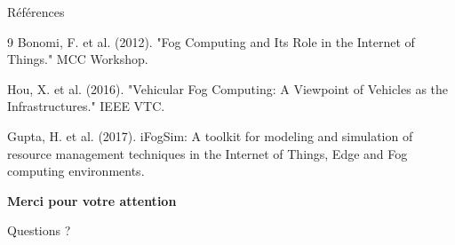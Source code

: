 ﻿\documentclass[aspectratio=169,11pt]{beamer}
\begin{document}
\begin{frame}{R\'ef\'erences}
\footnotesize
\begin{thebibliography}{9}
 Bonomi, F. et al. (2012). "Fog Computing and Its Role in the Internet of Things." MCC Workshop.

 Hou, X. et al. (2016). "Vehicular Fog Computing: A Viewpoint of Vehicles as the Infrastructures." IEEE VTC.

 Gupta, H. et al. (2017). iFogSim: A toolkit for modeling and simulation of resource management techniques in the Internet of Things, Edge and Fog computing environments.

\end{thebibliography}
\end{frame}

\begin{frame}
\centering
\Huge\textbf{Merci pour votre attention}

\vspace{1cm}
\Large Questions ?

\vspace{1cm}
\end{frame}
\end{document}
